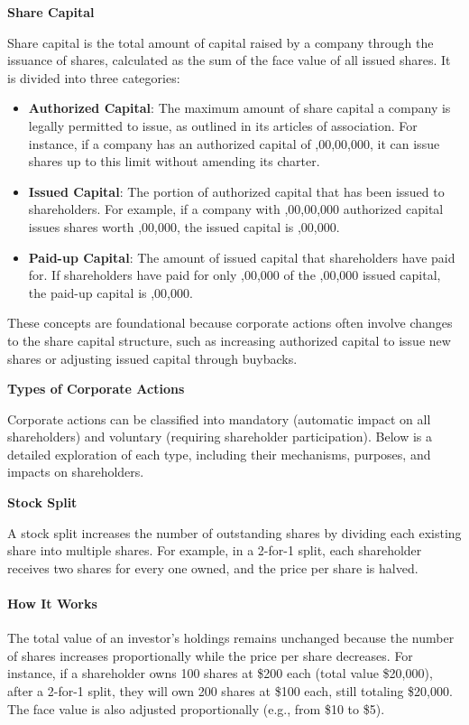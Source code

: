 \documentclass[12pt]{article}
\begin{document}
\textbf{Share Capital}

Share capital is the total amount of capital raised by a company through the issuance of shares, calculated as the sum of the face value of all issued shares. It is divided into three categories:

\begin{itemize}
    \item \textbf{Authorized Capital}: The maximum amount of share capital a company is legally permitted to issue, as outlined in its articles of association. For instance, if a company has an authorized capital of ,00,00,000, it can issue shares up to this limit without amending its charter.
    \item \textbf{Issued Capital}: The portion of authorized capital that has been issued to shareholders. For example, if a company with ,00,00,000 authorized capital issues shares worth ,00,000, the issued capital is ,00,000.
    \item \textbf{Paid-up Capital}: The amount of issued capital that shareholders have paid for. If shareholders have paid for only ,00,000 of the ,00,000 issued capital, the paid-up capital is ,00,000.
\end{itemize}

These concepts are foundational because corporate actions often involve changes to the share capital structure, such as increasing authorized capital to issue new shares or adjusting issued capital through buybacks.

\textbf{Types of Corporate Actions}

Corporate actions can be classified into mandatory (automatic impact on all shareholders) and voluntary (requiring shareholder participation). Below is a detailed exploration of each type, including their mechanisms, purposes, and impacts on shareholders.

\textbf{Stock Split}

A stock split increases the number of outstanding shares by dividing each existing share into multiple shares. For example, in a 2-for-1 split, each shareholder receives two shares for every one owned, and the price per share is halved.

\paragraph{How It Works}
The total value of an investor's holdings remains unchanged because the number of shares increases proportionally while the price per share decreases. For instance, if a shareholder owns 100 shares at \$200 each (total value \$20,000), after a 2-for-1 split, they will own 200 shares at \$100 each, still totaling \$20,000. The face value is also adjusted proportionally (e.g., from \$10 to \$5).
\end{document}
